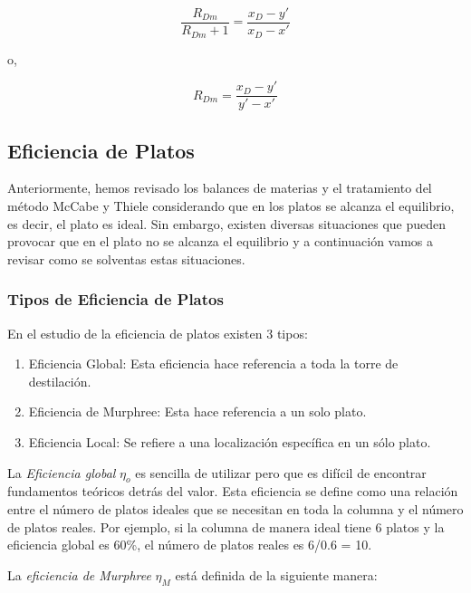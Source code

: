 \documentclass[11pt]{book}
\begin{document}
\begin{equation}
    \label{eq:ReflujoMinimo_1}
    \frac{R_{Dm}}{R_{Dm} + 1} = \frac{x_D - y'}{x_D - x'}
\end{equation}

o,

\begin{equation}
    \label{eq:ReflujoMinimo_2}
    R_{Dm} = \frac{x_D - y'}{y' - x'}
\end{equation}

\subsection{Eficiencia de Platos}

Anteriormente, hemos revisado los balances de materias y el tratamiento del método McCabe y Thiele considerando que en los platos se alcanza el equilibrio, es decir, el plato es ideal. Sin embargo, existen diversas situaciones que pueden provocar que en el plato no se alcanza el equilibrio y a continuación vamos a revisar como se solventas estas situaciones.

\subsubsection{Tipos de Eficiencia de Platos}

En el estudio de la eficiencia de platos existen 3 tipos:

\begin{enumerate}
    \item Eficiencia Global: Esta eficiencia hace referencia a toda la torre de destilación.
    
    \item Eficiencia de Murphree: Esta hace referencia a un solo plato.
    
    \item Eficiencia Local: Se refiere a una localización específica en un sólo plato.
\end{enumerate}

La \textit{Eficiencia global} $\eta_o$ es sencilla de utilizar pero que es difícil de encontrar fundamentos teóricos detrás del valor. Esta eficiencia se define como una relación entre el número de platos ideales que se necesitan en toda la columna y el número de platos reales. Por ejemplo, si la columna de manera ideal tiene 6 platos y la eficiencia global es 60\%, el número de platos reales es 6/0.6 = 10.

La \textit{eficiencia de Murphree} $\eta_M$ está definida de la siguiente manera:
\end{document}
